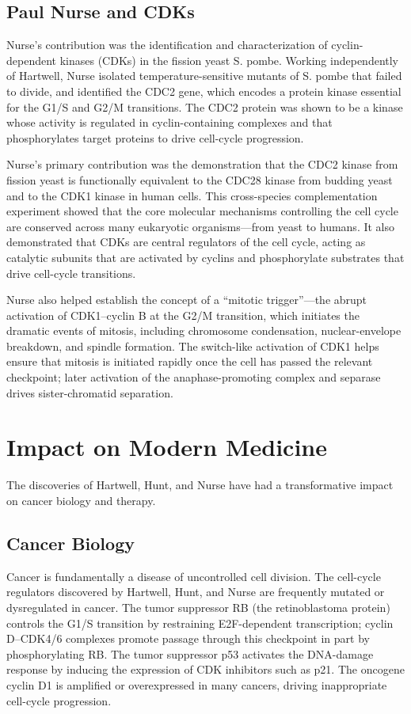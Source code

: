 \subsection{Paul Nurse and CDKs}

Nurse's contribution was the identification and characterization of cyclin-dependent kinases (CDKs) in the fission yeast S. pombe. Working independently of Hartwell, Nurse isolated temperature-sensitive mutants of S. pombe that failed to divide, and identified the CDC2 gene, which encodes a protein kinase essential for the G1/S and G2/M transitions. The CDC2 protein was shown to be a kinase whose activity is regulated in cyclin-containing complexes and that phosphorylates target proteins to drive cell-cycle progression.

Nurse's primary contribution was the demonstration that the CDC2 kinase from fission yeast is functionally equivalent to the CDC28 kinase from budding yeast and to the CDK1 kinase in human cells. This cross-species complementation experiment showed that the core molecular mechanisms controlling the cell cycle are conserved across many eukaryotic organisms---from yeast to humans. It also demonstrated that CDKs are central regulators of the cell cycle, acting as catalytic subunits that are activated by cyclins and phosphorylate substrates that drive cell-cycle transitions.

Nurse also helped establish the concept of a ``mitotic trigger''---the abrupt activation of CDK1--cyclin B at the G2/M transition, which initiates the dramatic events of mitosis, including chromosome condensation, nuclear-envelope breakdown, and spindle formation. The switch-like activation of CDK1 helps ensure that mitosis is initiated rapidly once the cell has passed the relevant checkpoint; later activation of the anaphase-promoting complex and separase drives sister-chromatid separation.

\section{Impact on Modern Medicine}

The discoveries of Hartwell, Hunt, and Nurse have had a transformative impact on cancer biology and therapy.

\subsection{Cancer Biology}

Cancer is fundamentally a disease of uncontrolled cell division. The cell-cycle regulators discovered by Hartwell, Hunt, and Nurse are frequently mutated or dysregulated in cancer. The tumor suppressor RB (the retinoblastoma protein) controls the G1/S transition by restraining E2F-dependent transcription; cyclin D--CDK4/6 complexes promote passage through this checkpoint in part by phosphorylating RB. The tumor suppressor p53 activates the DNA-damage response by inducing the expression of CDK inhibitors such as p21. The oncogene cyclin D1 is amplified or overexpressed in many cancers, driving inappropriate cell-cycle progression.


